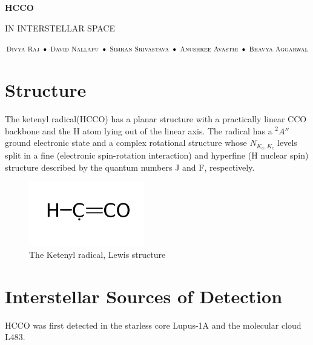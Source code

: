 \documentclass[12 pt]{article}
\begin{document}
	
	\begin{center}
		
		\begin{Huge}
		\textbf{HCCO}
		\end{Huge}
			
		\begin{Large}
		\textsc{IN INTERSTELLAR SPACE\linebreak}
		\end{Large}
		
		\begin{scriptsize}
		$
		\textsc{Divya Raj }\bullet\textsc{ David Nallapu }\bullet\textsc{ Simran Srivastava }\bullet\textsc{ Anushree Avasthi }\bullet						\textsc{ Bhavya Aggarwal}	
		$
		\end{scriptsize}
				
	\end{center}
	
	\section*{Structure}
		The  ketenyl  radical(HCCO) has  a  planar  structure  with  a  practically  linear  CCO  backbone  and  the  H  atom  lying  out  of  			the	linear  axis.  The  radical  has a ${}^2A''$ ground  electronic  state  and a  complex  rotational  structure  whose $N_{K_a,K_c}$ 			levels  split in  a	fine (electronic spin-rotation interaction) and hyperfine (H nuclear  spin)  structure  described  by  the  quantum  		numbers J and F, respectively.
		
		\begin{figure}[h!]
		  \includegraphics[width=50mm]{hcco.png}
  			\centering
  			\caption{The Ketenyl radical, Lewis structure }
  			\label{fig:PublicKey-Basic}
		\end{figure}
		
	\section*{Interstellar Sources of Detection}
		HCCO was first detected in the starless core Lupus-1A and the molecular cloud L483.\cite{mcg}
		
\end{document}
